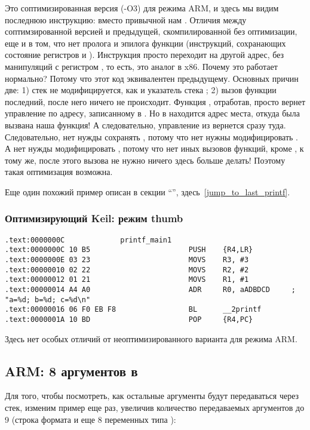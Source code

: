 Это соптимизированная версия (-O3) для режима ARM, и здесь мы видим последнюю инструкцию:  вместо привычной
нам . 
Отличия между соптимзированной версией и предыдущей, скомпилированной без оптимизации, еще и в том, 
что нет пролога и эпилога функции (инструкций, сохранающих состояние регистров  и \LR).
Инструкция  просто переходит на другой адрес, без манипуляций с регистром \LR, то есть,
это аналог \JMP в x86.
Почему это работает нормально? Потому что этот код эквивалентен предыдущему.
Основных причин две: 1) стек не модифицируется, как и указатель стека \SP; 2) вызов функции \printf последний, 
после него ничего не происходит.
Функция \printf, отработав, просто вернет управление по адресу, записанному в \LR. Но в \LR находится адрес места,
откуда была вызвана наша функция! А следовательно, управление из \printf вернется сразу туда.
Следовательно, нет нужды сохранять \LR, потому что нет нужны модифицировать \LR. 
А нет нужды модифицировать \LR,
потому что нет иных вызовов функций, кроме \printf, к тому же, после этого вызова не нужно ничего здесь 
больше делать! Поэтому такая оптимизация возможна.

Еще один похожий пример описан в секции ``\SwitchCaseDefaultSectionName'', здесь~\ref{jump_to_last_printf}.

\subsubsection{Оптимизирующий Keil: режим thumb}

\begin{lstlisting}
.text:0000000C             printf_main1
.text:0000000C 10 B5                       PUSH    {R4,LR}
.text:0000000E 03 23                       MOVS    R3, #3
.text:00000010 02 22                       MOVS    R2, #2
.text:00000012 01 21                       MOVS    R1, #1
.text:00000014 A4 A0                       ADR     R0, aADBDCD     ; "a=%d; b=%d; c=%d\n"
.text:00000016 06 F0 EB F8                 BL      __2printf
.text:0000001A 10 BD                       POP     {R4,PC}
\end{lstlisting}

Здесь нет особых отличий от неоптимизированного варианта для режима ARM.

\subsection{ARM: 8 аргументов в \printf}

Для того, чтобы посмотреть, как остальные аргументы будут передаваться через стек, изменим пример еще раз, 
увеличив количество передаваемых аргументов до 9 (строка формата \printf и еще 8 переменных типа \Tint):

